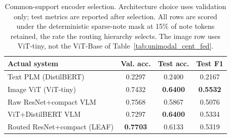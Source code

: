 
\begin{table}[t]
\caption{Common-support encoder selection. Architecture choice uses validation only; test metrics are reported after selection. All rows are scored under the deterministic sparse-note mask at 15\% of note tokens retained, the rate the routing hierarchy selects. The image row uses ViT-tiny, not the ViT-Base of Table~\ref{tab:unimodal_cent_fed}.}
\label{tab:family_comparison}
\centering\footnotesize
\setlength\tabcolsep{4pt}
\begin{tabular}{lccc}
\toprule
\textbf{Actual system} & \textbf{Val. acc.} & \textbf{Test acc.} & \textbf{Test F1}\\
\midrule
Text PLM (DistilBERT) & 0.2297 & 0.2400 & 0.2167\\
Image ViT (ViT-tiny) & 0.7432 & \textbf{0.6400} & \textbf{0.5532}\\
Raw ResNet$+$compact VLM & 0.7568 & 0.5867 & 0.5076\\
ViT$+$DistilBERT VLM & 0.7297 & \textbf{0.6400} & 0.5334\\
Routed ResNet$+$compact (LEAF) & \textbf{0.7703} & 0.6133 & 0.5319\\
\bottomrule
\end{tabular}
\end{table}
